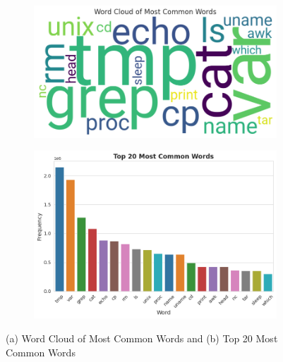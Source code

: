         \begin{figure}[h]
            \centering
            \begin{subfigure}[c]{0.47\textwidth}
                \centering
                \includegraphics[width=\textwidth]{../figures/plots/section1/word_cloud_of_most_common_words.png}
                \label{fig:word-cloud}
            \end{subfigure}
            \hfill
            \begin{subfigure}[c]{0.47\textwidth}
                \centering
                \includegraphics[width=\textwidth]{../figures/plots/section1/top_10_most_common_words.png}
                \label{fig:common-words}
            \end{subfigure}
            \vspace{-0.6cm}
            \caption{(a) Word Cloud of Most Common Words and (b) Top 20 Most Common Words}
            \label{fig:common-words-comparison}
        \end{figure}

